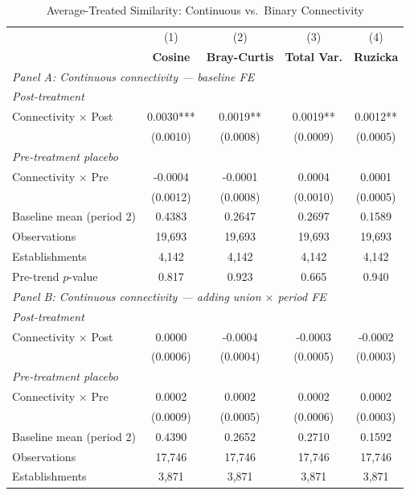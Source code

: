 \begin{table}[H]
\centering
\caption{Average-Treated Similarity: Continuous vs.\ Binary Connectivity}
\scriptsize
\setlength{\tabcolsep}{6pt}
\begin{tabular}{lcccc}
\hline\hline
 & (1) & (2) & (3) & (4) \\
 & \textbf{Cosine} & \textbf{Bray-Curtis} & \textbf{Total Var.} & \textbf{Ruzicka} \\
\hline
\multicolumn{5}{l}{\textit{Panel A: Continuous connectivity — baseline FE}} \\
\multicolumn{5}{l}{\textit{Post-treatment}} \\
Connectivity $\times$ Post & 0.0030*** & 0.0019** & 0.0019** & 0.0012** \\
 & (0.0010) & (0.0008) & (0.0009) & (0.0005) \\
\multicolumn{5}{l}{\textit{Pre-treatment placebo}} \\
Connectivity $\times$ Pre & -0.0004 & -0.0001 & 0.0004 & 0.0001 \\
 & (0.0012) & (0.0008) & (0.0010) & (0.0005) \\
\hline
Baseline mean (period 2) & 0.4383 & 0.2647 & 0.2697 & 0.1589 \\
Observations &       19,693 &       19,693 &       19,693 &       19,693 \\
Establishments &        4,142 &        4,142 &        4,142 &        4,142 \\
Pre-trend $p$-value & 0.817 & 0.923 & 0.665 & 0.940 \\
\hline
\multicolumn{5}{l}{\textit{Panel B: Continuous connectivity — adding union $\times$ period FE}} \\
\multicolumn{5}{l}{\textit{Post-treatment}} \\
Connectivity $\times$ Post & 0.0000 & -0.0004 & -0.0003 & -0.0002 \\
 & (0.0006) & (0.0004) & (0.0005) & (0.0003) \\
\multicolumn{5}{l}{\textit{Pre-treatment placebo}} \\
Connectivity $\times$ Pre & 0.0002 & 0.0002 & 0.0002 & 0.0002 \\
 & (0.0009) & (0.0005) & (0.0006) & (0.0003) \\
\hline
Baseline mean (period 2) & 0.4390 & 0.2652 & 0.2710 & 0.1592 \\
Observations &       17,746 &       17,746 &       17,746 &       17,746 \\
Establishments &        3,871 &        3,871 &        3,871 &        3,871 \\

\end{tabular}
\end{table}
